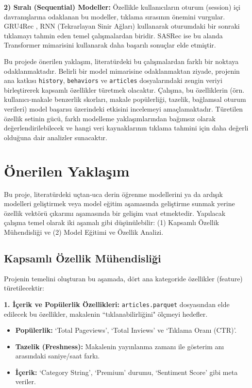 \documentclass[conference]{IEEEtran}
\begin{document}
\textbf{2) Sıralı (Sequential) Modeller:} Özellikle kullanıcıların oturum (session) içi davranışlarına odaklanan bu modeller, tıklama sırasının önemini vurgular. GRU4Rec \cite{hidasi2015gru4rec}, RNN (Tekrarlayan Sinir Ağları) kullanarak oturumdaki bir sonraki tıklamayı tahmin eden temel çalışmalardan biridir. SASRec \cite{kang2018sasrec} ise bu alanda Transformer mimarisini kullanarak daha başarılı sonuçlar elde etmiştir.

Bu projede önerilen yaklaşım, literatürdeki bu çalışmalardan farklı bir noktaya odaklanmaktadır. Belirli bir model mimarisine odaklanmaktan ziyade, projenin ana katkısı \texttt{history}, \texttt{behaviors} ve \texttt{articles} dosyalarındaki zengin veriyi birleştirerek kapsamlı özellikler türetmek olacaktır. Çalışma, bu özelliklerin (örn. kullanıcı-makale benzerlik skorları, makale popülerliği, tazelik, bağlamsal oturum verileri) model başarısı üzerindeki etkisini incelemeyi amaçlamaktadır. Türetilen özellik setinin gücü, farklı modelleme yaklaşımlarından bağımsız olarak değerlendirilebilecek ve hangi veri kaynaklarının tıklama tahmini için daha değerli olduğuna dair analizler sunacaktır.


\section{Önerilen Yaklaşım}
\label{sec:approach}

Bu proje, literatürdeki uçtan-uca derin öğrenme modellerini ya da ardışık modelleri geliştirmek veya model eğitim aşamasında geliştirme sunmak yerine özellik vektörü çıkarımı aşamasında bir gelişim vaat etmektedir. Yapılacak çalışma temel olarak iki aşamalı gibi düşünülebilir: (1) Kapsamlı Özellik Mühendisliği ve (2) Model Eğitimi ve Özellik Analizi.

\subsection{Kapsamlı Özellik Mühendisliği}
Projenin temelini oluşturan bu aşamada, dört ana kategoride özellikler (feature) türetilecektir:

\textbf{1. İçerik ve Popülerlik Özellikleri:} \texttt{articles.parquet} dosyasından elde edilecek bu özellikler, makalenin ``tıklanabilirliğini" ölçmeyi hedefler.
\begin{itemize}
    \item \textbf{Popülerlik:} `Total Pageviews', `Total Inviews' ve `Tıklama Oranı (CTR)'.
    \item \textbf{Tazelik (Freshness):} Makalenin yayınlanma zamanı ile gösterim anı arasındaki saniye/saat farkı.
    \item \textbf{İçerik:} `Category String', `Premium' durumu, `Sentiment Score' gibi meta veriler.
\end{itemize}
\end{document}
